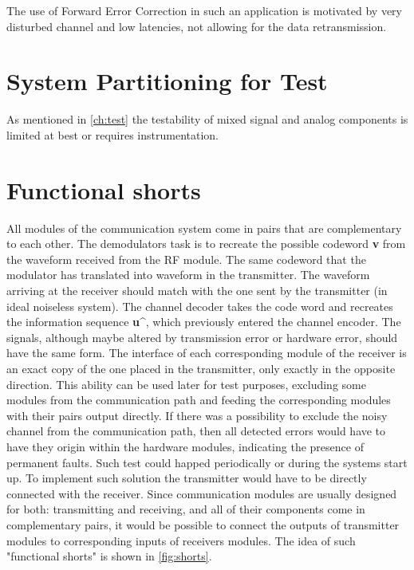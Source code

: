 The use of Forward Error Correction in such an application is motivated by very disturbed channel and low latencies, not allowing for the data retransmission.

\section{System Partitioning for Test}
 As mentioned in \autoref{ch:test} the testability of mixed signal and analog components is limited at best or requires instrumentation. 

\section{Functional shorts}

All modules of the communication system come in pairs that are complementary to each other. The demodulators task is to recreate the possible codeword \textbf{v} from the waveform received from the RF module. The same codeword that the modulator has translated into waveform in the transmitter. The waveform arriving at the receiver should match with the one sent by the transmitter (in ideal noiseless system). The channel decoder takes the code word and recreates the information sequence \textbf{u\^}, which previously entered the channel encoder. The signals, although maybe altered by transmission error or hardware error, should have the same form. The interface of each corresponding module of the receiver is an exact copy of the one placed in the transmitter, only exactly in the opposite direction. This ability can be used later for test purposes, excluding some modules from the communication path and feeding the corresponding modules with their pairs output directly.
If there was a possibility to exclude the noisy channel from the communication path, then all detected errors would have to have they origin within the hardware modules, indicating the presence of permanent faults. Such test could happed periodically or during the systems start up.
To implement such solution the transmitter would have to be directly connected with the receiver. Since communication modules are usually designed for both: transmitting and receiving, and all of their components come in complementary pairs, it would be possible to connect the outputs of transmitter modules to corresponding inputs of receivers modules. The idea of such "functional shorts" is shown in \autoref{fig:shorts}.
\section{}
